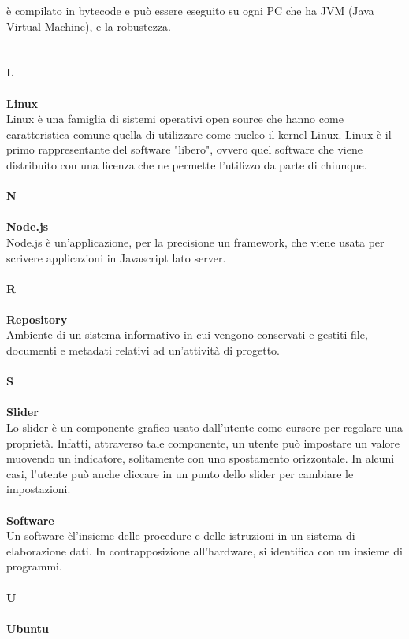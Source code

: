 è compilato in bytecode e può essere eseguito su ogni PC che ha JVM (Java Virtual Machine), e la robustezza. \\
\\
\\
\textbf{L} \\
\\
\textbf{Linux} \\
Linux è una famiglia di sistemi operativi open source che hanno come caratteristica comune quella di utilizzare come nucleo il kernel Linux. Linux è il primo rappresentante del software "libero", ovvero quel software che viene distribuito con una licenza che ne permette l'utilizzo da parte di chiunque. \\
\\
\textbf{N}\\
\\
\textbf{Node.js} \\
Node.js è un’applicazione, per la precisione un framework, che viene usata per scrivere applicazioni in Javascript lato server. \\
\\
\textbf{R} \\
\\
\textbf{Repository} \\
Ambiente di un sistema informativo in cui vengono conservati e gestiti file, documenti e metadati relativi ad un’attività di progetto. \\
\\
\textbf{S} \\
\\
\textbf{Slider} \\
Lo slider è un componente grafico usato dall'utente come cursore per regolare una proprietà. Infatti, attraverso tale componente, un utente può impostare un valore muovendo un indicatore, solitamente con uno spostamento orizzontale. In alcuni casi, l'utente può anche cliccare in un punto dello slider per cambiare le impostazioni.  \\
\\
\textbf{Software} \\
Un software èl'insieme delle procedure e delle istruzioni in un sistema di elaborazione dati. In contrapposizione all'hardware, si identifica con un insieme di programmi. \\
\\
\textbf{U} \\
\\
\textbf{Ubuntu} \\
\\
